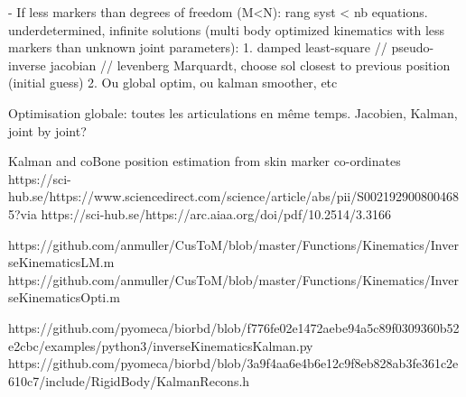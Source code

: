 

- If less markers than degrees of freedom (M<N): rang syst < nb equations. underdetermined, infinite solutions
(multi body optimized kinematics with less markers than unknown joint parameters): 
1. damped least-square // pseudo-inverse jacobian // levenberg Marquardt, choose sol closest to previous position (initial guess)
2. Ou global optim, ou kalman smoother, etc












Optimisation globale: toutes les articulations en même temps. Jacobien, Kalman, joint by joint?





Kalman and coBone position estimation from skin marker co-ordinates 
https://sci-hub.se/https://www.sciencedirect.com/science/article/abs/pii/S0021929008004685?via%
https://sci-hub.se/https://arc.aiaa.org/doi/pdf/10.2514/3.3166


https://github.com/anmuller/CusToM/blob/master/Functions/Kinematics/InverseKinematicsLM.m 
https://github.com/anmuller/CusToM/blob/master/Functions/Kinematics/InverseKinematicsOpti.m

https://github.com/pyomeca/biorbd/blob/f776fe02e1472aebe94a5c89f0309360b52e2cbc/examples/python3/inverseKinematicsKalman.py
https://github.com/pyomeca/biorbd/blob/3a9f4aa6e4b6e12c9f8eb828ab3fe361c2e610c7/include/RigidBody/KalmanRecons.h


